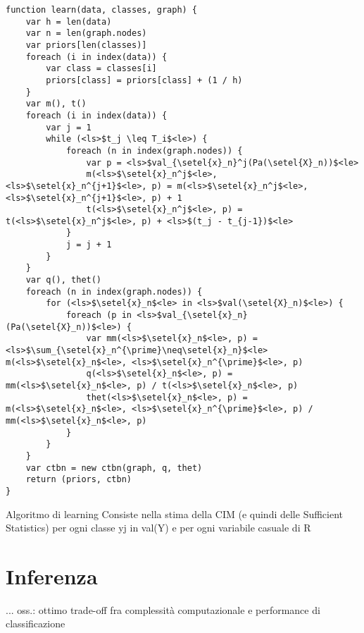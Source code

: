 \begin{lstlisting}[caption=Apprendimento di un classificatore \acs{CTBN}, label=lst:ctbnc-learning]
function learn(data, classes, graph) {
    var h = len(data)
    var n = len(graph.nodes)
    var priors[len(classes)]
    foreach (i in index(data)) {
        var class = classes[i]
        priors[class] = priors[class] + (1 / h)
    }
    var m(), t()
    foreach (i in index(data)) {
        var j = 1
        while (<ls>$t_j \leq T_i$<le>) {
            foreach (n in index(graph.nodes)) {
                var p = <ls>$val_{\setel{x}_n}^j(Pa(\setel{X}_n))$<le>
                m(<ls>$\setel{x}_n^j$<le>, <ls>$\setel{x}_n^{j+1}$<le>, p) = m(<ls>$\setel{x}_n^j$<le>, <ls>$\setel{x}_n^{j+1}$<le>, p) + 1
                t(<ls>$\setel{x}_n^j$<le>, p) = t(<ls>$\setel{x}_n^j$<le>, p) + <ls>$(t_j - t_{j-1})$<le>
            }
            j = j + 1
        }
    }
    var q(), thet()
    foreach (n in index(graph.nodes)) {
        for (<ls>$\setel{x}_n$<le> in <ls>$val(\setel{X}_n)$<le>) {
            foreach (p in <ls>$val_{\setel{x}_n}(Pa(\setel{X}_n))$<le>) {
                var mm(<ls>$\setel{x}_n$<le>, p) = <ls>$\sum_{\setel{x}_n^{\prime}\neq\setel{x}_n}$<le> m(<ls>$\setel{x}_n$<le>, <ls>$\setel{x}_n^{\prime}$<le>, p)
                q(<ls>$\setel{x}_n$<le>, p) = mm(<ls>$\setel{x}_n$<le>, p) / t(<ls>$\setel{x}_n$<le>, p)
                thet(<ls>$\setel{x}_n$<le>, p) = m(<ls>$\setel{x}_n$<le>, <ls>$\setel{x}_n^{\prime}$<le>, p) / mm(<ls>$\setel{x}_n$<le>, p)
            }
        }
    }
    var ctbn = new ctbn(graph, q, thet)
    return (priors, ctbn)
}
\end{lstlisting}


Algoritmo di learning
Consiste nella stima della CIM (e quindi delle Sufficient Statistics) per
ogni classe yj in val(Y) e per ogni variabile casuale di R


\section{Inferenza}\label{sec:inference-ctbnc}
...
oss.: ottimo trade-off fra complessità computazionale e performance di
classificazione

